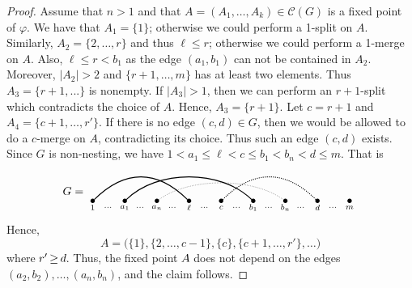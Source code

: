 \documentclass[ALCO,ThmDefs,Unicode,epreuves]{cedram}
\newcommand*{\mk}{\mkern -1mu}
\newcommand*{\Mk}{\mkern -2mu}
\begin{document}
\begin{proof} 
Assume that $n>1$ and that $A=(A_1,\ldots,A_k)\in \mathcal{C}(G)$ is a fixed point of $\varphi$. We have that $A_1=\{1\}$; otherwise we could perform a 1-split on $A$. Similarly, $A_2=\{2,\ldots,r\}$ and thus $ \ell\le r$; otherwise we could perform a 1-merge on $A$. Also, $\ell\le r<b_1$ as the edge $(a_1,b_1)$ can not be contained in $A_2$. Moreover, $|A_2|>2$ and $\{r+1,\ldots,m\}$ has at least two elements. Thus $A_3=\{r+1,...\}$ is nonempty. If $|A_3|>1$, then we can perform an $r+1$-split which contradicts the choice of $A$. Hence, $A_3=\{r+1\}$. Let $c=r+1$ and $A_4=\{c+1,\ldots,r'\}$. If there is no edge $(c,d)\in G$, then we would be allowed to do a $c$-merge on $A$, contradicting its choice. Thus such an edge $(c,d)$ exists. Since $G$ is non-nesting, we have $ 1<a_1\le\ell <c\le b_1<b_n<d\le m$. That is
\begin{equation}\label{eq:firstarcs}
G=
\begin{tikzpicture}[baseline=.2cm]
	\foreach \x in {1,3,5,7,9,11,13,15,17} 
		\node (\x) at (\x/2,0) [inner sep=-1pt] {$\bullet$};
	\node at (1/2,-.2) {$\scriptstyle 1$};
	\node at (2/2,-.2) {$\scriptstyle \cdots$};	
	\node at (3/2,-.2) {$\scriptstyle a_1$};
	\node at (4/2,-.2) {$\scriptstyle \cdots$};	
	\node at (5/2,-.2) {$\scriptstyle a_n$};
	\node at (6/2,-.2) {$\scriptstyle \cdots$};	
	\node at (7/2,-.2) {$\scriptstyle \ell$};
	\node at (8/2,-.2) {$\scriptstyle \cdots$};	
	\node at (9/2,-.2) {$\scriptstyle c$};
	\node at (10/2,-.2) {$\scriptstyle \cdots$};	
	\node at (11/2,-.2) {$\scriptstyle b_1$};
	\node at (12/2,-.2) {$\scriptstyle \cdots$};	
	\node at (13/2,-.2) {$\scriptstyle b_n$};
	\node at (14/2,-.2) {$\scriptstyle \cdots$};	
	\node at (15/2,-.2) {$\scriptstyle d$};
	\node at (16/2,-.2) {$\scriptstyle \cdots$};	
	\node at (17/2,-.2) {$\scriptstyle m$};
	\draw [thick] (1) .. controls (3/2,1) and (5/2,1) .. (7); 
	\draw [thick] (3) .. controls (5/2,1) and (9/2,1) .. (11); 
	\draw [densely dotted] (5) .. controls (7/2,.75) and (11/2,.75) .. (13); 
	\draw [densely dotted,thick] (9) .. controls (11/2,1) and (13/2,1) .. (15); 
\end{tikzpicture} 
 \end{equation}
Hence,
 \begin{equation}\label{eq:firstparts}
 A=\big(\{1\},\{2,\ldots,c-1\},\{c\},\{c+1,\ldots,r'\},\ldots\big)
 \end{equation}
where $\mk r'\Mk \ge \Mk d\mk$. Thus, the fixed point $\mk A\mk$ does not depend on the edges $(a_2,b_2),\ldots,(a_n,b_n)$, and the claim follows.
\end{proof}
\end{document}
